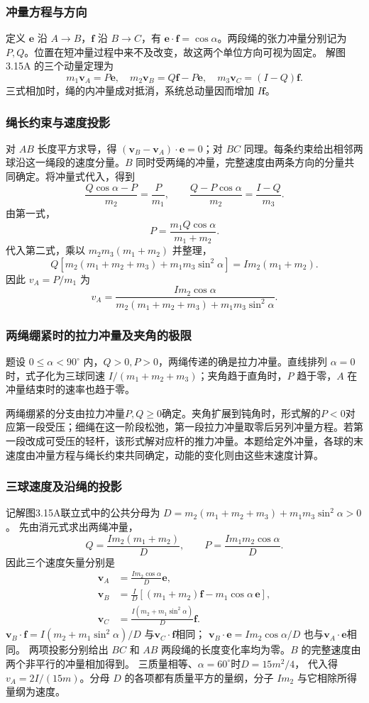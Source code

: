 \documentclass[UTF8,fontset=fandol,a4paper,11pt]{ctexart}
\newcommand{\vect}[1]{\bm{#1}}
\begin{document}
\subsubsection*{冲量方程与方向}
定义 $\vect e$ 沿 $A\to B$，$\vect f$ 沿 $B\to C$，有 $\vect e\cdot\vect f=\cos\alpha$。两段绳的张力冲量分别记为 $P,Q$。位置在短冲量过程中来不及改变，故这两个单位方向可视为固定。
解图 3.15A 的三个动量定理为
\[
m_1\vect v_A=P\vect e,\quad
m_2\vect v_B=Q\vect f-P\vect e,\quad
m_3\vect v_C=(I-Q)\vect f.
\]
三式相加时，绳的内冲量成对抵消，系统总动量因而增加 $I\vect f$。

\subsubsection*{绳长约束与速度投影}
对 $AB$ 长度平方求导，得
$(\vect v_B-\vect v_A)\cdot\vect e=0$；对 $BC$ 同理。每条约束给出相邻两球沿这一绳段的速度分量。$B$ 同时受两绳的冲量，完整速度由两条方向的分量共同确定。将冲量式代入，得到
\[
\frac{Q\cos\alpha-P}{m_2}=\frac{P}{m_1},
\qquad
\frac{Q-P\cos\alpha}{m_2}=\frac{I-Q}{m_3}.
\]
由第一式，
\[
P=\frac{m_1Q\cos\alpha}{m_1+m_2}.
\]
代入第二式，乘以 $m_2m_3(m_1+m_2)$ 并整理，
\[
Q\left[m_2(m_1+m_2+m_3)+m_1m_3\sin^2\alpha\right]
=I m_2(m_1+m_2).
\]
因此 $v_A=P/m_1$ 为
\[
\boxed{v_A=
\frac{I m_2\cos\alpha}
{m_2(m_1+m_2+m_3)+m_1m_3\sin^2\alpha}}.
\]

\subsubsection*{两绳绷紧时的拉力冲量及夹角的极限}
题设 $0\leq\alpha<90^\circ$ 内，$Q>0,P>0$，两绳传递的确是拉力冲量。直线排列 $\alpha=0$ 时，式子化为三球同速 $I/(m_1+m_2+m_3)$；夹角趋于直角时，$P$ 趋于零，$A$ 在冲量结束时的速率也趋于零。

两绳绷紧的分支由拉力冲量$P,Q\ge0$确定。夹角扩展到钝角时，形式解的$P<0$对应第一段受压；细绳在这一阶段松弛，第一段拉力冲量取零后另列冲量方程。若第一段改成可受压的轻杆，该形式解对应杆的推力冲量。本题给定外冲量，各球的末速度由冲量方程与绳长约束共同确定，动能的变化则由这些末速度计算。
\subsubsection*{三球速度及沿绳的投影}
记解图3.15A联立式中的公共分母为
$D=m_2(m_1+m_2+m_3)+m_1m_3\sin^2\alpha>0$。
先由消元式求出两绳冲量，
\[
Q=\frac{I m_2(m_1+m_2)}D,
\qquad P=\frac{I m_1m_2\cos\alpha}D.
\]
因此三个速度矢量分别是
\[
\begin{aligned}
\vect v_A&=\frac{I m_2\cos\alpha}D\vect e,\\
\vect v_B&=\frac I D[(m_1+m_2)\vect f-m_1\cos\alpha\,\vect e],\\
\vect v_C&=\frac{I(m_2+m_1\sin^2\alpha)}D\vect f.
\end{aligned}
\]
$\vect v_B\cdot\vect f=I(m_2+m_1\sin^2\alpha)/D$
与$\vect v_C\cdot\vect f$相同；
$\vect v_B\cdot\vect e=I m_2\cos\alpha/D$
也与$\vect v_A\cdot\vect e$相同。
两项投影分别给出 $BC$ 和 $AB$ 两段绳的长度变化率均为零。$B$ 的完整速度由两个非平行的冲量相加得到。
三质量相等、$\alpha=60^\circ$时$D=15m^2/4$，
代入得$v_A=2I/(15m)$。分母 $D$ 的各项都有质量平方的量纲，分子 $I m_2$ 与它相除所得量纲为速度。
\end{document}
